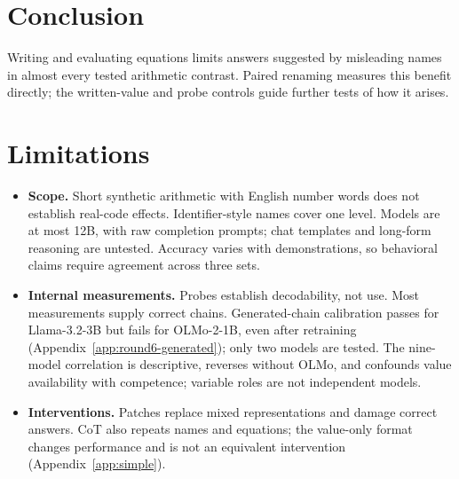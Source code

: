 \documentclass[11pt]{article}
\begin{document}
\section{Conclusion}

Writing and evaluating equations limits answers suggested by misleading names in almost
every tested arithmetic contrast. Paired renaming measures this benefit directly;
the written-value and probe controls guide further tests of how it arises.

\section*{Limitations}

\begin{itemize}
\item \textbf{Scope.} Short synthetic arithmetic with English number words does not establish
real-code effects. Identifier-style names cover one level. Models are at most 12B, with raw
completion prompts; chat templates and long-form reasoning are untested. Accuracy varies
with demonstrations, so behavioral claims require agreement across three sets.
\item \textbf{Internal measurements.} Probes establish decodability, not use. Most measurements
supply correct chains. Generated-chain calibration passes for Llama-3.2-3B but fails for
OLMo-2-1B, even after retraining (Appendix~\ref{app:round6-generated}); only two models are tested.
The nine-model correlation is descriptive, reverses without OLMo, and confounds value
availability with competence; variable roles are not independent models.
\item \textbf{Interventions.} Patches replace mixed representations and damage correct answers.
CoT also repeats names and equations; the value-only format changes performance and is not
an equivalent intervention (Appendix~\ref{app:simple}).
\end{itemize}



\appendix
\clearpage

\end{document}
